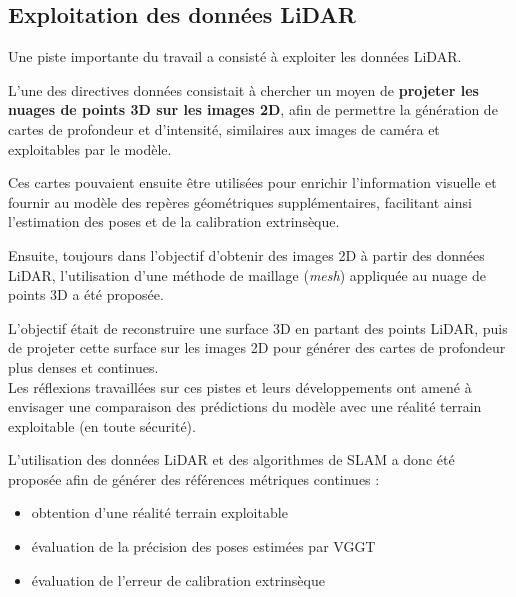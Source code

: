 \documentclass[12pt,a4paper,oneside]{report}
\newcommand{\textsb}[1]{{\fontseries{sb}\selectfont #1}}
\begin{document}
\newpage

\vspace{5cm}

\subsection{Exploitation des données LiDAR}

\vspace{1cm}

\textsb{ Une piste importante du travail a consisté à exploiter les données LiDAR.} \vspace{0.1cm}

\hspace*{1cm} L'une des directives données consistait à chercher un moyen de \textbf{projeter les nuages de points 3D sur les images 2D}, afin de permettre la génération de cartes de profondeur et d'intensité, similaires aux images de caméra et exploitables par le modèle.\vspace{0.05cm}

\hspace*{.5cm} Ces cartes pouvaient ensuite être utilisées pour enrichir l'information visuelle et fournir au modèle des repères géométriques supplémentaires, facilitant ainsi l'estimation des poses et de la calibration extrinsèque.\vspace{0.1cm}

\hspace*{.5cm} Ensuite, toujours dans l'objectif d'obtenir des images 2D à partir des données LiDAR, l'utilisation d'une méthode de maillage (\textit{mesh}) appliquée au nuage de points 3D a été proposée. \vspace{0.05cm}

\hspace*{.5cm}L'objectif était de reconstruire une surface 3D en partant des points LiDAR, puis de projeter cette surface sur les images 2D pour générer des cartes de profondeur plus denses et continues.\\

\hspace*{.5cm} Les réflexions travaillées sur ces pistes et leurs développements ont amené à envisager une comparaison des prédictions du modèle avec une réalité terrain exploitable (en toute sécurité).\vspace{0.1cm}

\hspace*{.5cm}L'utilisation des données LiDAR et des algorithmes de SLAM a donc été proposée afin de générer des références métriques continues : \vspace{0.1cm}
\begin{itemize}[label=\textbullet]
    \item obtention d'une réalité terrain exploitable
    \item évaluation de la précision des poses estimées par VGGT
    \item évaluation de l'erreur de calibration extrinsèque
\end{itemize}
\end{document}
